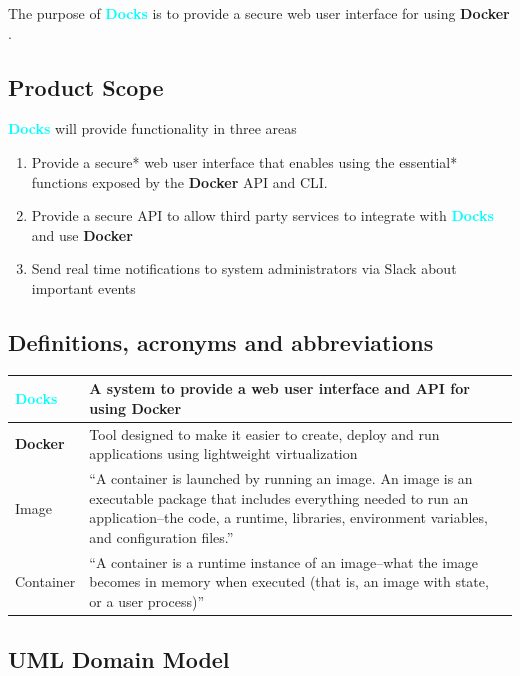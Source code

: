 \documentclass[]{article}
\newcommand{\docks}{\textbf{\textcolor{Cyan}{Docks}} }
\newcommand{\docker}{\textbf{\textcolor{OliveGreen}{Docker}} }
\begin{document}
The purpose of \docks is to provide a secure web user interface
for using \docker.

\subsection{Product Scope}

\docks will provide functionality in three areas
\begin{enumerate}
	\item Provide a secure* web user interface that enables using the
	      essential* functions exposed by the \docker API and CLI.
	\item Provide a secure API to allow third party services to integrate
	      with \docks and use \docker
	\item Send real time notifications to system administrators via Slack about
	      important events
\end{enumerate}

\subsection{Definitions, acronyms and abbreviations}

\begin{table}[H]
	\begin{tabular}{|p{2cm}|p{10cm}|}
		\hline
		\docks &  A system to provide a web user interface and API for using \docker \\ \hline

		\docker & Tool designed to make it easier to create, deploy and run applications
		using lightweight virtualization \\ \hline

		Image & ``A container is launched by running an image.
		An image is an executable package that includes everything
		needed to run an application--the code, a runtime, libraries,
		environment variables, and configuration files.'' \\ \hline

		Container & ``A container is a runtime instance 
		of an image--what the image becomes in memory when 
		executed (that is, an image with state, or a user process)'' \\ \hline

	\end{tabular}
\end{table}

\subsection{UML Domain Model}
\end{document}
